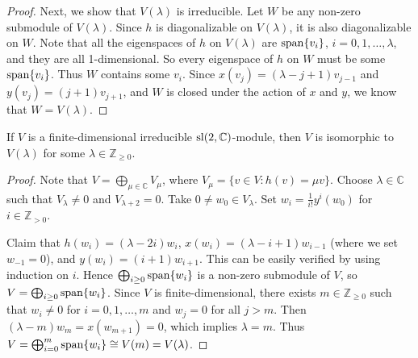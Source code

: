 \begin{proof}
    Next, we show that $V(\lambda)$ is irreducible. Let $W$ be any non-zero submodule of $V(\lambda)$. Since $h$ is diagonalizable on $V(\lambda)$, it is also diagonalizable on $W$. Note that all the eigenspaces of $h$ on $V(\lambda)$ are $\span\{v_i\}$, $i=0,1,\ldots,\lambda$, and they are all 1-dimensional. So every eigenspace of $h$ on $W$ must be some $\span\{v_i\}$. Thus $W$ contains some $v_i$. Since $x(v_j)=(\lambda-j+1)v_{j-1}$ and $y(v_j)=(j+1)v_{j+1}$, and $W$ is closed under the action of $x$ and $y$, we know that $W=V(\lambda)$.
\end{proof}

\begin{thm}
    If $V$ is a finite-dimensional irreducible $\sl(2,\mathbb{C})$-module, then $V$ is isomorphic to $V(\lambda)$ for some $\lambda\in\mathbb{Z}_{\geq 0}$.
\end{thm}

\begin{proof}
    Note that $V=\bigoplus_{\mu\in\mathbb{C}}V_\mu$, where $V_\mu=\{v\in V:h(v) = \mu v\}$. Choose $\lambda\in\mathbb{C}$ such that $V_\lambda\neq 0$ and $V_{\lambda+2}=0$. Take $0\neq w_0 \in V_\lambda$. Set $w_i=\frac{1}{i!}y^i(w_0)$ for $i\in\mathbb{Z}_{>0}$. 
    
    Claim that $h(w_i)=(\lambda-2i)w_i$, $x(w_i)=(\lambda-i+1)w_{i-1}$ (where we set $w_{-1}=0$), and $y(w_i)=(i+1)w_{i+1}$. This can be easily verified by using induction on $i$. Hence $\bigoplus_{i\geq 0}\span\{w_i\}$ is a non-zero submodule of $V$, so $V=\bigoplus_{i\geq 0}\span\{w_i\}$. Since $V$ is finite-dimensional, there exists $m\in\mathbb{Z}_{\geq 0}$ such that $w_i\neq 0$ for $i=0,1,\ldots,m$ and $w_{j}=0$ for all $j>m$. Then $(\lambda - m)w_m=x(w_{m+1})=0$, which implies $\lambda=m$. Thus $V=\bigoplus_{i= 0}^{m}\span\{w_i\}\cong V(m)=V(\lambda)$.
\end{proof}




























